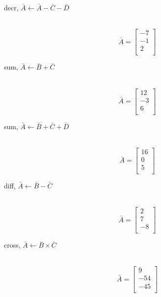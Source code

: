 \begin{description}
  \item[decr, $\bar{A} \leftarrow \bar{A}-\bar{C}-\bar{D}$]\ \newline
   \begin{equation}\nonumber
   \bar{A} = \left[
   \begin{array}{r}
      -7  \\
      -1  \\
       2  \\
   \end{array}\right]
   \end{equation}

  \item[sum, $\bar{A} \leftarrow \bar{B}+\bar{C}$]\ \newline
   \begin{equation}\nonumber
   \bar{A} = \left[
   \begin{array}{r}
      12  \\
      -3  \\
       6 \\
   \end{array}\right]
   \end{equation}

  \item[sum, $\bar{A} \leftarrow \bar{B}+\bar{C}+\bar{D}$]\ \newline
   \begin{equation}\nonumber
   \bar{A} = \left[
   \begin{array}{r}
      16  \\
       0  \\
       5 \\
   \end{array}\right]
   \end{equation}

  \item[diff, $\bar{A} \leftarrow \bar{B}-\bar{C}$]\ \newline
   \begin{equation}\nonumber
   \bar{A} = \left[
   \begin{array}{r}
       2  \\
       7  \\
      -8 \\
   \end{array}\right]
   \end{equation}

  \item[cross, $\bar{A} \leftarrow \bar{B}\times\bar{C}$]\ \newline
   \begin{equation}\nonumber
   \bar{A} = \left[
   \begin{array}{r}
       9  \\
     -54  \\
     -45 \\
   \end{array}\right]
   \end{equation}


\end{description}
